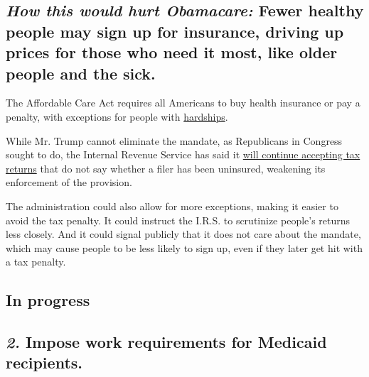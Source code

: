 \hypertarget{how-this-would-hurt-obamacare-fewer-healthy-people-may-sign-up-for-insurance-driving-up-prices-for-those-who-need-it-most-like-older-people-and-the-sick}{%
\subsection{\texorpdfstring{\emph{How this would hurt Obamacare:} Fewer
healthy people may sign up for insurance, driving up prices for those
who need it most, like older people and the
sick.}{How this would hurt Obamacare: Fewer healthy people may sign up for insurance, driving up prices for those who need it most, like older people and the sick.}}\label{how-this-would-hurt-obamacare-fewer-healthy-people-may-sign-up-for-insurance-driving-up-prices-for-those-who-need-it-most-like-older-people-and-the-sick}}

The Affordable Care Act requires all Americans to buy health insurance
or pay a penalty, with exceptions for people with
\href{https://www.healthcare.gov/glossary/hardship-exemption/}{hardships}.

While Mr. Trump cannot eliminate the mandate, as Republicans in Congress
sought to do, the Internal Revenue Service has said it
\href{https://www.nytimes.com/2017/02/15/us/politics/affordable-care-act-obamacare-trump.html}{will
continue accepting tax returns} that do not say whether a filer has been
uninsured, weakening its enforcement of the provision.

The administration could also allow for more exceptions, making it
easier to avoid the tax penalty. It could instruct the I.R.S. to
scrutinize people's returns less closely. And it could signal publicly
that it does not care about the mandate, which may cause people to be
less likely to sign up, even if they later get hit with a tax penalty.

\hypertarget{in-progress-1}{%
\subsection{In progress}\label{in-progress-1}}

\hypertarget{2-impose-work-requirements-for-medicaid-recipients}{%
\subsection{\texorpdfstring{\emph{\textbf{2.}} \textbf{Impose work
requirements for Medicaid
recipients.}}{2. Impose work requirements for Medicaid recipients.}}\label{2-impose-work-requirements-for-medicaid-recipients}}

